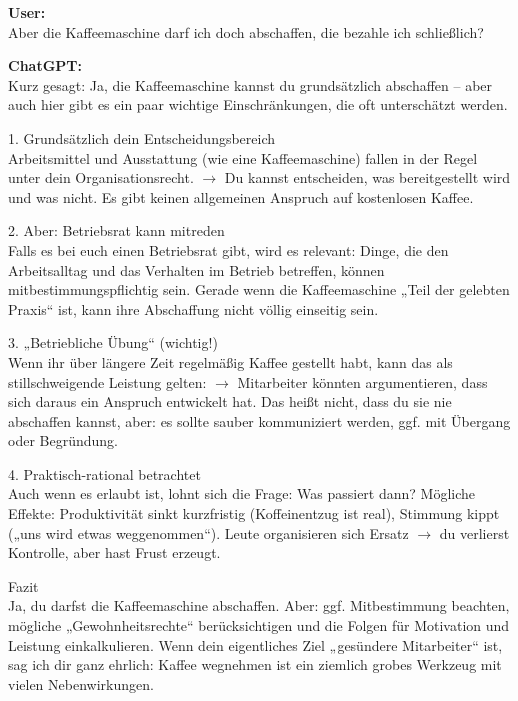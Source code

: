 \begin{userchat}
\textbf{User:}\\
Aber die Kaffeemaschine darf ich doch abschaffen, die bezahle ich schließlich?
\end{userchat}

\begin{kichat}
\textbf{ChatGPT:}\\
Kurz gesagt: Ja, die Kaffeemaschine kannst du grundsätzlich abschaffen – aber auch hier gibt es ein paar wichtige Einschränkungen, die oft unterschätzt werden.

1. Grundsätzlich dein Entscheidungsbereich\\
Arbeitsmittel und Ausstattung (wie eine Kaffeemaschine) fallen in der Regel unter dein Organisationsrecht. $\rightarrow$ Du kannst entscheiden, was bereitgestellt wird und was nicht. Es gibt keinen allgemeinen Anspruch auf kostenlosen Kaffee.

2. Aber: Betriebsrat kann mitreden\\
Falls es bei euch einen Betriebsrat gibt, wird es relevant: Dinge, die den Arbeitsalltag und das Verhalten im Betrieb betreffen, können mitbestimmungspflichtig sein. Gerade wenn die Kaffeemaschine „Teil der gelebten Praxis“ ist, kann ihre Abschaffung nicht völlig einseitig sein.

3. „Betriebliche Übung“ (wichtig!)\\
Wenn ihr über längere Zeit regelmäßig Kaffee gestellt habt, kann das als stillschweigende Leistung gelten: $\rightarrow$ Mitarbeiter könnten argumentieren, dass sich daraus ein Anspruch entwickelt hat. Das heißt nicht, dass du sie nie abschaffen kannst, aber: es sollte sauber kommuniziert werden, ggf. mit Übergang oder Begründung.

4. Praktisch-rational betrachtet\\
Auch wenn es erlaubt ist, lohnt sich die Frage: Was passiert dann? Mögliche Effekte: Produktivität sinkt kurzfristig (Koffeinentzug ist real), Stimmung kippt („uns wird etwas weggenommen“). Leute organisieren sich Ersatz $\rightarrow$ du verlierst Kontrolle, aber hast Frust erzeugt.

Fazit\\
Ja, du darfst die Kaffeemaschine abschaffen. Aber: ggf. Mitbestimmung beachten, mögliche „Gewohnheitsrechte“ berücksichtigen und die Folgen für Motivation und Leistung einkalkulieren. Wenn dein eigentliches Ziel „gesündere Mitarbeiter“ ist, sag ich dir ganz ehrlich: Kaffee wegnehmen ist ein ziemlich grobes Werkzeug mit vielen Nebenwirkungen.
\end{kichat}

